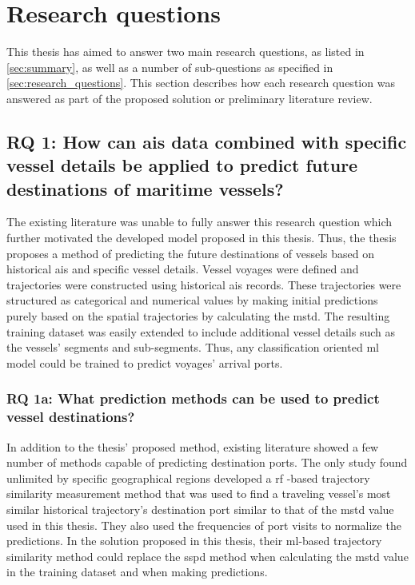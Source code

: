 \section{Research questions}

This thesis has aimed to answer two main research questions, as listed in \cref{sec:summary}, as well as a number of sub-questions as specified in \cref{sec:research_questions}. This section describes how each research question was answered as part of the proposed solution or preliminary literature review.

\subsection{RQ 1: How can \acrshort{ais} data combined with specific vessel details be applied to predict future destinations of maritime vessels?}

The existing literature was unable to fully answer this research question which further motivated the developed model proposed in this thesis. Thus, the thesis proposes a method of predicting the future destinations of vessels based on historical \acrshort{ais} and specific vessel details. Vessel voyages were defined and trajectories were constructed using historical \acrshort{ais} records. These trajectories were structured as categorical and numerical values by making initial predictions purely based on the spatial trajectories by calculating the \acrfull{mstd}. The resulting training dataset was easily extended to include additional vessel details such as the vessels' segments and sub-segments. Thus, any classification oriented \acrshort{ml} model could be trained to predict voyages' arrival ports.

\subsubsection{RQ 1a: What prediction methods can be used to predict vessel destinations?}

In addition to the thesis' proposed method, existing literature showed a few number of methods capable of predicting destination ports. The only study found unlimited by specific geographical regions developed a \acrfull{rf} -based trajectory similarity measurement method that was used to find a traveling vessel's most similar historical trajectory's destination port similar to that of the \acrshort{mstd} value used in this thesis. They also used the frequencies of port visits to normalize the predictions. In the solution proposed in this thesis, their \acrshort{ml}-based trajectory similarity method could replace the \acrshort{sspd} method when calculating the \acrshort{mstd} value in the training dataset and when making predictions.

